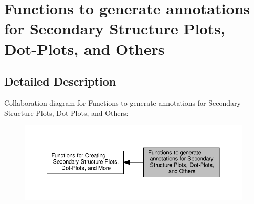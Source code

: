 \hypertarget{group__annotation__utils}{}\section{Functions to generate annotations for Secondary Structure Plots, Dot-\/\+Plots, and Others}
\label{group__annotation__utils}


\subsection{Detailed Description}
Collaboration diagram for Functions to generate annotations for Secondary Structure Plots, Dot-\/\+Plots, and Others\+:
\nopagebreak
\begin{figure}[H]
\begin{center}
\leavevmode
\includegraphics[width=350pt]{group__annotation__utils}
\end{center}
\end{figure}
